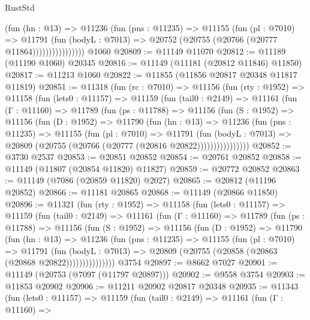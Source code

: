 \begin{lexlean}{RustStd}
\begin{coremodule}
                      (fun (hn : @13) =>
                      @11236
                        (fun (pns : @11235) =>
                        @11155
                          (fun (pl : @7010) =>
                          @11791
                            (fun (bodyL : @7013) =>
                            @20752 (@20755 (@20766 (@20777 @11864))))))))))))))))
    @1060
@20809 := @11149 @11070
@20812 := @11189 (@11190 @1060) @20345
@20816 := @11149 (@11181 (@20812 @11846) @11850)
@20817 := @11213 @1060
@20822 := @11855 (@11856 @20817 @20348 @11817 @11819)
@20851 := @11318
    (fun (rc : @7010) =>
    @11156
      (fun (rty : @1952) =>
      @11158
        (fun (lets0 : @11157) =>
        @11159
          (fun (tail0 : @2149) =>
          @11161
            (fun (Γ : @11160) =>
            @11789
              (fun (ps : @11788) =>
              @11156
                (fun (S : @1952) =>
                @11156
                  (fun (D : @1952) =>
                  @11790
                    (fun (hn : @13) =>
                    @11236
                      (fun (pns : @11235) =>
                      @11155
                        (fun (pl : @7010) =>
                        @11791
                          (fun (bodyL : @7013) =>
                          @20809 (@20755 (@20766 (@20777 (@20816 @20822))))))))))))))))
@20852 := @3730 @2537
@20853 := @20851 @20852
@20854 := @20761 @20852
@20858 := @11149 (@11807 (@20854 @11820) @11827)
@20859 := @20772 @20852
@20863 := @11149 (@7086 (@20859 @11820) @2027)
@20865 := @20812 (@11196 @20852)
@20866 := @11181 @20865
@20868 := @11149 (@20866 @11850)
@20896 := @11321
    (fun (rty : @1952) =>
    @11158
      (fun (lets0 : @11157) =>
      @11159
        (fun (tail0 : @2149) =>
        @11161
          (fun (Γ : @11160) =>
          @11789
            (fun (ps : @11788) =>
            @11156
              (fun (S : @1952) =>
              @11156
                (fun (D : @1952) =>
                @11790
                  (fun (hn : @13) =>
                  @11236
                    (fun (pns : @11235) =>
                    @11155
                      (fun (pl : @7010) =>
                      @11791
                        (fun (bodyL : @7013) =>
                        @20809 (@20755 (@20858 (@20863 (@20868 @20822)))))))))))))))
    @3754
@20897 := @8662 @7027
@20901 := @11149 (@20753 (@7097 (@11797 @20897)))
@20902 := @9558 @3754
@20903 := @11853 @20902
@20906 := @11211 @20902 @20817 @20348
@20935 := @11343
    (fun (lets0 : @11157) =>
    @11159
      (fun (tail0 : @2149) =>
      @11161
        (fun (Γ : @11160) =>

\end{coremodule}
\end{lexlean}
